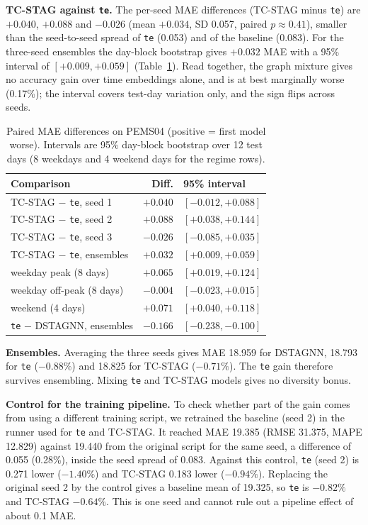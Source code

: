 \documentclass[conference]{IEEEtran}
\begin{document}
\textbf{TC-STAG against \texttt{te}.} The per-seed MAE differences (TC-STAG minus \texttt{te}) are $+0.040$, $+0.088$ and $-0.026$ (mean $+0.034$, SD 0.057, paired $p\approx0.41$), smaller than the seed-to-seed spread of \texttt{te} (0.053) and of the baseline (0.083). For the three-seed ensembles the day-block bootstrap gives $+0.032$ MAE with a 95\% interval of $[+0.009,+0.059]$ (Table~\ref{tab:paired}). Read together, the graph mixture gives no accuracy gain over time embeddings alone, and is at best marginally worse (0.17\%); the interval covers test-day variation only, and the sign flips across seeds.
\begin{table}[t]
\centering\caption{Paired MAE differences on PEMS04 (positive = first model worse). Intervals are 95\% day-block bootstrap over 12 test days (8 weekdays and 4 weekend days for the regime rows).}\label{tab:paired}
\footnotesize
\begin{tabular}{@{}lrl@{}}
\toprule
Comparison & Diff. & 95\% interval\\
\midrule
TC-STAG $-$ \texttt{te}, seed 1 & $+0.040$ & $[-0.012,+0.088]$\\
TC-STAG $-$ \texttt{te}, seed 2 & $+0.088$ & $[+0.038,+0.144]$\\
TC-STAG $-$ \texttt{te}, seed 3 & $-0.026$ & $[-0.085,+0.035]$\\
TC-STAG $-$ \texttt{te}, ensembles & $+0.032$ & $[+0.009,+0.059]$\\
\quad weekday peak (8 days) & $+0.065$ & $[+0.019,+0.124]$\\
\quad weekday off-peak (8 days) & $-0.004$ & $[-0.023,+0.015]$\\
\quad weekend (4 days) & $+0.071$ & $[+0.040,+0.118]$\\
\texttt{te} $-$ DSTAGNN, ensembles & $-0.166$ & $[-0.238,-0.100]$\\
\bottomrule
\end{tabular}
\end{table}

\textbf{Ensembles.} Averaging the three seeds gives MAE 18.959 for DSTAGNN, 18.793 for \texttt{te} ($-0.88\%$) and 18.825 for TC-STAG ($-0.71\%$). The \texttt{te} gain therefore survives ensembling. Mixing \texttt{te} and TC-STAG models gives no diversity bonus.

\textbf{Control for the training pipeline.} To check whether part of the gain comes from using a different training script, we retrained the baseline (seed 2) in the runner used for \texttt{te} and TC-STAG. It reached MAE 19.385 (RMSE 31.375, MAPE 12.829) against 19.440 from the original script for the same seed, a difference of 0.055 (0.28\%), inside the seed spread of 0.083. Against this control, \texttt{te} (seed 2) is 0.271 lower ($-1.40\%$) and TC-STAG 0.183 lower ($-0.94\%$). Replacing the original seed 2 by the control gives a baseline mean of 19.325, so \texttt{te} is $-0.82\%$ and TC-STAG $-0.64\%$. This is one seed and cannot rule out a pipeline effect of about 0.1 MAE.
\end{document}
